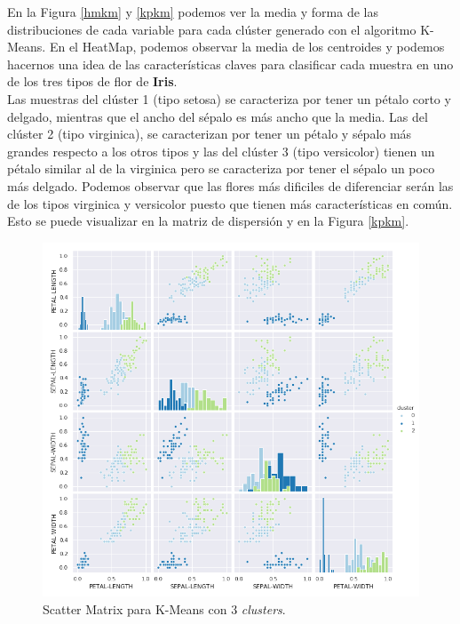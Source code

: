 \documentclass[a4paper, 20pt]{article}
\begin{document}
En la Figura \ref{hmkm} y \ref{kpkm} podemos ver la media y forma de las distribuciones de cada variable para cada clúster generado con el algoritmo K-Means. En el HeatMap, podemos observar la media de los centroides y podemos hacernos una idea de las características claves para clasificar cada muestra en uno de los tres tipos de flor de \textbf{Iris}.\\

Las muestras del clúster 1 (tipo setosa) se caracteriza por tener un pétalo corto y delgado, mientras que el ancho del sépalo es más ancho que la media. Las del clúster 2 (tipo virginica), se caracterizan por tener un pétalo y sépalo más grandes respecto a los otros tipos y las del clúster 3 (tipo versicolor) tienen un pétalo similar al de la virginica pero se caracteriza por tener el sépalo un poco más delgado. Podemos observar que las flores más dificiles de diferenciar serán las de los tipos virginica y versicolor puesto que tienen más características en común. Esto se puede visualizar en la matriz de dispersión y en la Figura \ref{kpkm}.

\clearpage

\begin{figure}[h]
\centering
\includegraphics[scale=0.63]{dani/scatmatrixK-MeansIRIS.png}
\caption{Scatter Matrix para K-Means con 3 \textit{clusters}.}
\label{smkm}
\end{figure}\
\end{document}
